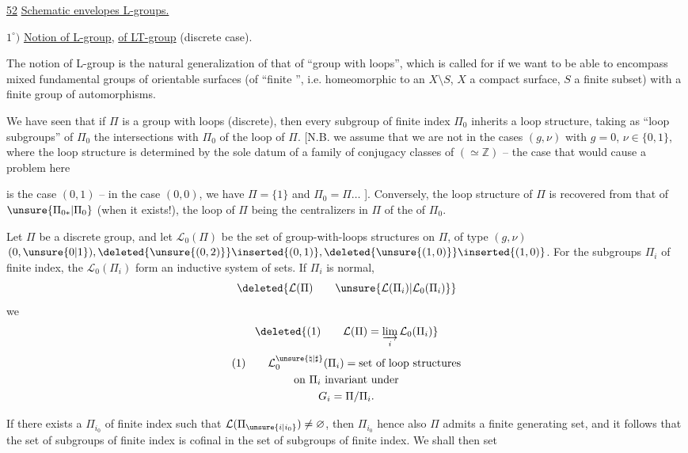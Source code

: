 
\uline{52}\qquad
\uline{Schematic envelopes  L-groups.}

$1^\circ)$ \uline{Notion of L-group}, \uline{of LT-group} (discrete case).

The notion of L-group is the natural
generalization of that of ``group with loops'',
which is called for if we want to be able to encompass
mixed fundamental groups of
orientable surfaces (of ``finite '', i.e.
homeomorphic to an $X\setminus S$, $X$ a compact surface,
$S$ a finite subset) with a finite group of automorphisms.

We have seen that if $\Pi$ is a
group with loops (discrete), then every subgroup
of finite index $\Pi_0$ inherits a
loop structure, taking as
``loop subgroups'' of $\Pi_0$ the intersections
with $\Pi_0$ of the loop  of $\Pi$. [N.B. we
assume that we are not in the cases
$(g,\nu)$  with $g=0$, $\nu\in\{0,1\}$, where the loop structure
is  determined by the sole datum of a
family of conjugacy classes of 
 $(\simeq\mathbb Z)$ -- the  case that would cause a problem here


is the case $(0,1)$  -- in the case $(0,0)$, we have $\Pi=\{1\}$
and $\Pi_0=\Pi\ldots$ ]. Conversely, the loop
structure of $\Pi$ is recovered from
that of $\unsure{\Pi_{0*}|\Pi_0}$ (when it exists!), the
loop  of $\Pi$ being the centralizers
in $\Pi$ of the  of $\Pi_0$.

Let $\Pi$ be a discrete group,
 and
let $\mathcal L_0(\Pi)$ be the set of group-with-loops
structures on $\Pi$, of type $(g,\nu)$
$(0,\unsure{0|1}),
\deleted{\unsure{(0,2)}}\inserted{(0,1)},
\deleted{\unsure{(1,0)}}\inserted{(1,0)}$.
For the subgroups  $\Pi_i$  of finite index,
the $\mathcal L_0(\Pi_i)$ form an inductive system
of sets.  If $\Pi_i$ is normal,
\[
\deleted{\mathcal L(\Pi)\qquad
\unsure{\mathcal L(\Pi_i)|\mathcal L_0(\Pi_i)}}
\]
we  
\[
\deleted{\text{(1)}\qquad
\mathcal L(\Pi)=\varinjlim_i\mathcal L_0(\Pi_i)}
\]
\[
\begin{gathered}
\text{(1)}\qquad
\mathcal L_0^{\unsure{\natural|\sharp}}(\Pi_i)=
\text{set of loop structures}\\
\text{on }\Pi_i\text{ invariant under}\\
G_i=\Pi/\Pi_i.
\end{gathered}
\]

If there exists a $\Pi_{i_0}$ of finite index such that
$\mathcal L(\Pi_{\unsure{i|i_0}})\ne\varnothing$, then $\Pi_{i_0}$ hence also $\Pi$ admits
a finite generating set, and it follows
that the set of  subgroups of finite index
is cofinal in the set of subgroups
of finite index. We shall then set